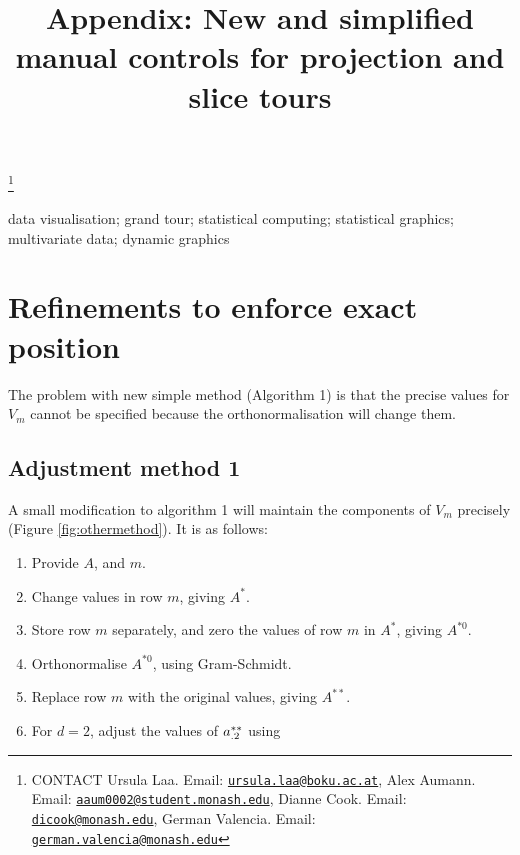 \documentclass[]{interact}
\theoremstyle{plain}%
\theoremstyle{definition}
\theoremstyle{remark}
\providecommand{\tightlist}{%
  \setlength{\itemsep}{0pt}\setlength{\parskip}{0pt}}
\def\tightlist{}
\begin{document}

\title{Appendix: New and simplified manual controls for projection and
slice tours}


\author{
}

\thanks{CONTACT Ursula
Laa. Email: \href{mailto:ursula.laa@boku.ac.at}{\nolinkurl{ursula.laa@boku.ac.at}}, Alex
Aumann. Email: \href{mailto:aaum0002@student.monash.edu}{\nolinkurl{aaum0002@student.monash.edu}}, Dianne
Cook. Email: \href{mailto:dicook@monash.edu}{\nolinkurl{dicook@monash.edu}}, German
Valencia. Email: \href{mailto:german.valencia@monash.edu}{\nolinkurl{german.valencia@monash.edu}}}

\maketitle


\begin{keywords}
data visualisation; grand tour; statistical computing; statistical
graphics; multivariate data; dynamic graphics
\end{keywords}

\hypertarget{refinements-to-enforce-exact-position}{%
\section{Refinements to enforce exact
position}\label{refinements-to-enforce-exact-position}}

The problem with new simple method (Algorithm 1) is that the precise
values for \(V_m\) cannot be specified because the orthonormalisation
will change them.

\hypertarget{adjustment-method-1}{%
\subsection{Adjustment method 1}\label{adjustment-method-1}}

A small modification to algorithm 1 will maintain the components of
\(V_m\) precisely (Figure \ref{fig:othermethod}). It is as follows:

\begin{enumerate}
\def\labelenumi{\arabic{enumi}.}
\tightlist
\item
  Provide \(A\), and \(m\).
\item
  Change values in row \(m\), giving \(A^*\).
\item
  Store row \(m\) separately, and zero the values of row \(m\) in
  \(A^*\), giving \(A^{*0}\).
\item
  Orthonormalise \(A^{*0}\), using Gram-Schmidt.
\item
  Replace row \(m\) with the original values, giving \(A^{**}\).
\item
  For \(d=2\), adjust the values of \({\boldmath a}^{**}_{.2}\) using
\end{enumerate}
\end{document}
